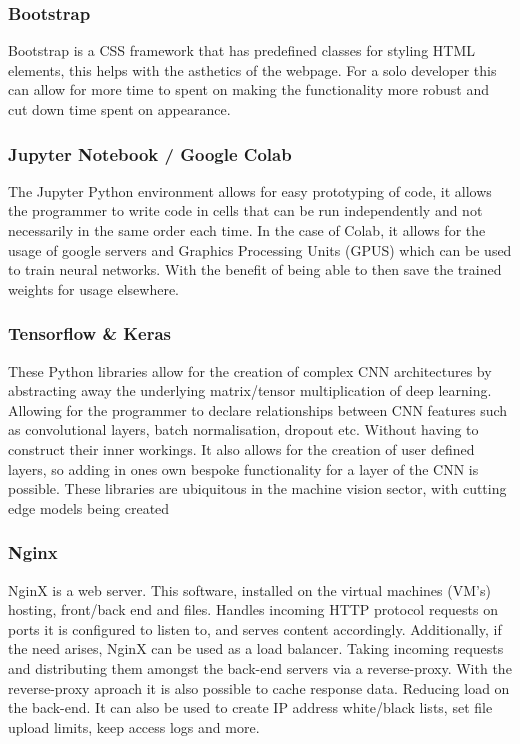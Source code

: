   \subsubsection{Bootstrap}
    Bootstrap is a CSS framework that has predefined classes for styling HTML elements, this helps with the asthetics of the webpage. For a solo developer this can allow for more time to spent on making the functionality more robust and cut down time spent on appearance.
  \subsubsection{Jupyter Notebook / Google Colab}
    The Jupyter Python environment allows for easy prototyping of code, it allows the programmer to write code in cells that can be run independently and not necessarily in the same order each time. In the case of Colab, it allows for the usage of google servers and Graphics Processing Units (GPUS) which can be used to train neural networks. With the benefit of being able to then save the trained weights for usage elsewhere.
  \subsubsection{Tensorflow \& Keras}
    These Python libraries allow for the creation of complex CNN architectures by abstracting away the underlying matrix/tensor multiplication of deep learning. Allowing for the programmer to declare relationships between CNN features such as convolutional layers, batch normalisation, dropout etc. Without having to construct their inner workings. It also allows for the creation of user defined layers, so adding in ones own bespoke functionality for a layer of the CNN is possible. These libraries are ubiquitous in the machine vision sector, with cutting edge models being created
  \subsubsection{Nginx}
    NginX is a web server. This software, installed on the virtual machines (VM's) hosting, front/back end and files. Handles incoming HTTP protocol requests on ports it is configured to listen to, and serves content accordingly. Additionally, if the need arises, NginX can be used as a load balancer. Taking incoming requests and distributing them amongst the back-end servers via a reverse-proxy. With the reverse-proxy aproach it is also possible to cache response data. Reducing load on the back-end. It can also be used to create IP address white/black lists, set file upload limits, keep access logs and more.
